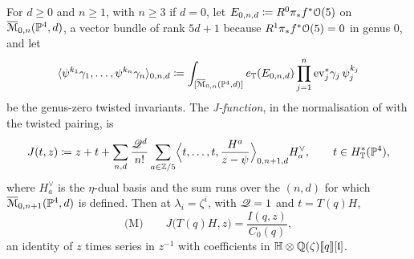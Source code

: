 \begin{thm}
\label{thm:set-mirror}
For $d\geq0$ and $n\geq1$, with $n\geq3$ if $d=0$, let $E_{0,n,d}\coloneqq R^0\pi_*f^*\mathcal{O}(5)$ on $\overline{\mathcal M}_{0,n}(\mathbb{P}^4,d)$, a vector bundle of rank $5d+1$ because $R^1\pi_*f^*\mathcal{O}(5)=0$ in genus $0$, and let
\[
\langle\psi^{k_1}\gamma_1,\dots,\psi^{k_n}\gamma_n\rangle_{0,n,d}\coloneqq\int_{[\overline{\mathcal M}_{0,n}(\mathbb{P}^4,d)]}e_{\mathbb{T}}(E_{0,n,d})\prod_{j=1}^n\mathrm{ev}_j^*\gamma_j\,\psi_j^{k_j}
\]
be the genus-zero twisted invariants. The \emph{J-function}, in the normalisation of \cite[Section~6, (10)]{MR2276766} with the twisted pairing, is
\[
J(t,z)\coloneqq z+t+\sum_{n,d}\frac{\mathscr{Q}^d}{n!}\sum_{a\in\mathbb{Z}/5}\Bigl\langle t,\dots,t,\frac{H^a}{z-\psi}\Bigr\rangle_{0,n+1,d}H^\vee_a,\qquad t\in H^*_{\mathbb{T}}(\mathbb{P}^4),
\]
where $H^\vee_a$ is the $\eta$-dual basis and the sum runs over the $(n,d)$ for which $\overline{\mathcal M}_{0,n+1}(\mathbb{P}^4,d)$ is defined. Then at $\lambda_i=\zeta^i$, with $\mathscr{Q}=1$ and $t=T(q)H$,
\[
\text{(M)}\qquad J\bigl(T(q)H,z\bigr)=\frac{I(q,z)}{C_0(q)},
\]
an identity of $z$ times series in $z^{-1}$ with coefficients in $\mathbb{H}\otimes\mathbb{Q}(\zeta)[\![ q ]\!][\mathfrak{l}]$.
\end{thm}

